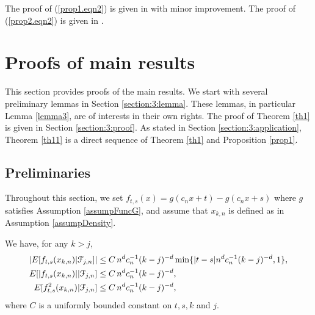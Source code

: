  The proof of (\ref{prop1.eqn2}) is given in \cite{wanglingulati2003a} with minor improvement. The proof of (\ref{prop2.eqn2}) is given in \citet[][Page 18]{csorgohorvath1993}.



\section{Proofs of main results} 

This section provides proofs of the main results. We start with several preliminary lemmas in Section \ref{section:3:lemma}.  These lemmas, in particular Lemma \ref{lemma3},  are of interests in their own rights. The proof of Theorem \ref{th1} is given in Section \ref{section:3:proof}. As stated in Section \ref{section:3:application}, Theorem \ref{th11} is a direct sequence of Theorem \ref{th1} and Proposition \ref{prop1}. 

\subsection{Preliminaries} 
Throughout this section, we set $f_{t,s}(x)=g(c_nx+t)-g(c_nx+s)$ where $g$ satisfies Assumption \ref{assumpFuncG}, and assume that $x_{k,n}$ is defined as in Assumption \ref{assumpDensity}.

\begin{lem}  We have, for any $k > j$,
\begin{align}
|E[f_{t,s}(x_{k,n}) | \mathcal F_{j,n}]| &\le C\, n^{d} c_n^{-1} (k - j)^{-d} \min \{ |t - s| n^d c_n^{-1} (k - j)^{-d}, 1\}, \nonumber\\
E[|f_{t,s}(x_{k,n})| | \mathcal F_{j,n}] &\le C\, n^{d} c_n^{-1} (k - j)^{-d},  \nonumber\\
E[f^2_{t,s}(x_{k,n}) | \mathcal F_{j,n}] &\le C\, n^{d} c_n^{-1} (k - j)^{-d},
\end{align}
where $C$ is a uniformly bounded constant on $t, s, k$ and $j$.
\end{lem}

